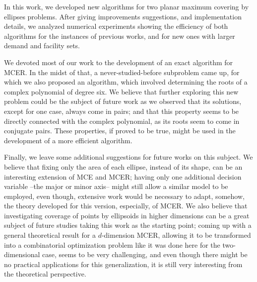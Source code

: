 In this work, we developed new algorithms for two planar maximum covering by ellipses problems.
After giving improvements suggestions, and implementation details, we analyzed numerical experiments showing the efficiency of both algorithms for the instances of previous works, and for new ones with larger demand and facility sets.

We devoted most of our work to the development of an exact algorithm for MCER.
In the midst of that, a never-studied-before subproblem came up, for which we also proposed an algorithm, which involved determining the roots of a complex polynomial of degree six.
We believe that further exploring this new problem could be the subject of future work as we observed that its solutions, except for one case, always come in pairs; and that this property seems to be directly connected with the complex polynomial, as its roots seem to come in conjugate pairs. These properties, if proved to be true, might be used in the development of a more efficient algorithm.

{\color{Green}
	Finally, we leave some additional suggestions for future works on this subject. We believe that fixing only the area of each ellipse, instead of its shape, can be an interesting extension of MCE and MCER; having only one additional decision variable --the major or minor axis-- might still allow a similar model to be employed, even though, extensive work would be necessary to adapt, somehow, the theory developed for this version, especially, of MCER.
We also believe that investigating coverage of points by ellipsoids in higher dimensions can be a great subject of future studies taking this work as the starting point; 
coming up with a general theoretical result for a $d$-dimension MCER, allowing it to be transformed into a combinatorial optimization problem like it was done here for the two-dimensional case, seems to be very challenging, and even though there might be no practical applications for this generalization, it is still very interesting from the theoretical perspective.
}